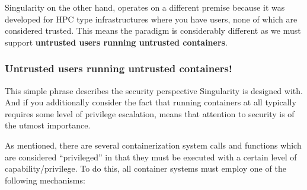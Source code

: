 \documentclass[a4paper]{article}
\newcounter{subsubsubsection}[subsubsection]
\begin{document}
Singularity on the other hand, operates on a different premise because it was developed for HPC type infrastructures where you have users, none of which are considered trusted. This means the paradigm is considerably different as we must support \textbf{untrusted users running untrusted containers}.

\subsubsection{Untrusted users running untrusted containers!}

This simple phrase describes the security perspective Singularity is designed with. And if you additionally consider the fact that running containers at all typically requires some level of privilege escalation, means that attention to security is of the utmost importance.\\[0.1in]


As mentioned, there are several containerization system calls and functions which are considered “privileged” in that they must be executed with a certain level of capability/privilege. To do this, all container systems must employ one of the following mechanisms:
\end{document}

